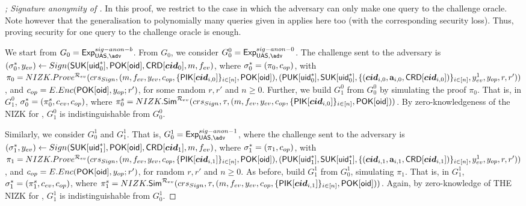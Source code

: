 \begin{proof}[; Signature anonymity of \CUASGen]

  In this proof, we restrict to the case in which the adversary can only make
  one query to the challenge oracle. Note however that the generalisation to
  polynomially many queries given in \cite{bsz05} applies here too (with the
  corresponding security loss). Thus, proving security for one query to the
  challenge oracle is enough.

  We start from $G_0=\ExpSigAnonb$.  %
  From $G_0$, we consider $G^0_0 = \ExpSigAnonz$. The challenge sent to the
  adversary is $(\mathsf{\sigma}^*_0,y_{ev}) \gets Sign(\mathsf{S}\mathsf{UK}[\mathsf{uid}^*_0],\mathsf{P}\mathsf{OK}[\mathsf{oid}],
  \mathsf{CRD}[\boldsymbol{cid}_0],m,f_{ev})$, where $\mathsf{\sigma}^*_0 = (\pi_0,c_{op})$, with
  $\pi_0 = NIZK.Prove^{\mathcal{R}_{ev}}(crs_{Sign},(m,f_{ev},y_{ev},
  c_{op},\lbrace\mathsf{P}\mathsf{IK}[\boldsymbol{cid}_{i,0}]\rbrace_{i\in[n]},\mathsf{P}\mathsf{OK}[\mathsf{oid}]),
  (\mathsf{P}\mathsf{UK}[\mathsf{uid}^*_0],\mathsf{S}\mathsf{UK}[\mathsf{uid}^*_0],\lbrace (\boldsymbol{cid}_{i,0},\mathbf{a}_{i,0},
  \mathsf{CRD}[\boldsymbol{cid}_{i,0}]) \rbrace_{i\in[n]},y_{ev}^1,y_{op},r,r'))$, and $c_{op} =
  E.Enc(\mathsf{P}\mathsf{OK}[\mathsf{oid}],y_{op};r')$, for some random $r,r'$ and $n \ge 0$.
  Further, we build $G_1^0$ from $G_0^0$ by simulating the proof $\pi_0$. That
  is, in $G_1^0$, $\mathsf{\sigma}^*_0 = (\pi_0^s,c_{ev},c_{op})$, where $\pi^s_0 =
  NIZK.\mathsf{Sim}^{\mathcal{R}_{ev}}(crs_{Sign},\tau,(m,f_{ev},y_{ev},
  c_{op},\lbrace\mathsf{P}\mathsf{IK}[\boldsymbol{cid}_{i,0}]\rbrace_{i\in[n]},\mathsf{P}\mathsf{OK}[\mathsf{oid}]))$. By
  zero-knowledgeness of the NIZK for \RelSig, $G_1^0$ is indistinguishable from
  $G_0^0$.

  Similarly, we consider $G_0^1$ and $G_1^1$. That is, $G_0^1 = \ExpSigAnono$,
  where the challenge
  sent to the adversary is $(\mathsf{\sigma}^*_1,y_{ev}) \gets Sign(\mathsf{S}\mathsf{UK}[\mathsf{uid}^*_1],
  \mathsf{P}\mathsf{OK}[\mathsf{oid}],\mathsf{CRD}[\boldsymbol{cid}_1],m,f_{ev})$, where $\mathsf{\sigma}^*_1 = (\pi_1,
  c_{op})$, with $\pi_1 = NIZK.Prove^{\mathcal{R}_{ev}}(crs_{Sign},
  (m,f_{ev},y_{ev},
  c_{op},\lbrace\mathsf{P}\mathsf{IK}[\boldsymbol{cid}_{i,1}]\rbrace_{i\in[n]},\mathsf{P}\mathsf{OK}[\mathsf{oid}]),
  (\mathsf{P}\mathsf{UK}[\mathsf{uid}^*_1],\mathsf{S}\mathsf{UK}[\mathsf{uid}^*_1],\lbrace (\boldsymbol{cid}_{i,1},\mathbf{a}_{i,1},
  \mathsf{CRD}[\boldsymbol{cid}_{i,1}]) \rbrace_{i\in[n]},y_{ev}^1,y_{op},r,r'))$, and
  $c_{op} = E.Enc(\mathsf{P}\mathsf{OK}[\mathsf{oid}],y_{op};r')$, for random $r,r'$ and $n \ge 0$. As
  before, build $G_1^1$ from $G_0^1$, simulating $\pi_1$. That is, in $G_1^1$,
  $\mathsf{\sigma}^*_1 = (\pi_1^s,c_{ev},c_{op})$, where $\pi^s_1 =
  NIZK.\mathsf{Sim}^{\mathcal{R}_{ev}}(crs_{Sign},\tau,(m,f_{ev},y_{ev},
  c_{op},\lbrace\mathsf{P}\mathsf{IK}[\boldsymbol{cid}_{i,1}]\rbrace_{i\in[n]},\mathsf{P}\mathsf{OK}[\mathsf{oid}]))$. Again, by
  zero-knowledge of THE NIZK for \RelSig, $G_1^1$ is
  indistinguishable from $G_0^1$.


\end{proof}
